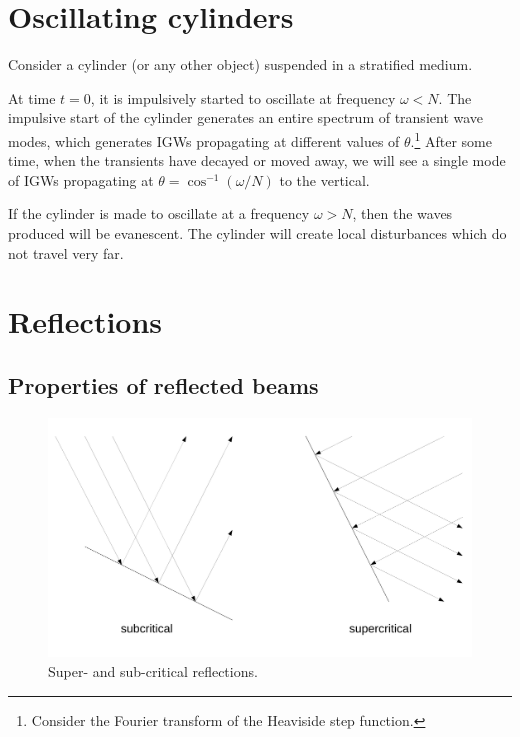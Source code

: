 \section{Oscillating cylinders}

Consider a cylinder (or any other object) suspended in a stratified medium.

At time $t=0$, it is impulsively started to oscillate at frequency $\omega<N$.
The impulsive start of the cylinder generates an entire spectrum of transient
wave modes, which generates IGWs propagating at different values of
$\theta$.\footnote{Consider the Fourier transform of the Heaviside step
function.} After some time, when the transients have decayed or moved away, we
will see a single mode of IGWs propagating at $\theta = \cos^{-1} (\omega/N)$ to
the vertical. 

If the cylinder is made to oscillate at a frequency $\omega > N$, then the waves
produced will be evanescent. The cylinder will create local disturbances which
do not travel very far.

\section{Reflections}
\subsection{Properties of reflected beams}

\begin{figure}
\begin{center}
	\includegraphics[width=14cm]{super-and-sub-critical.pdf}
	\caption{Super- and sub-critical reflections.}
	\label{fig:supersubcrit}
\end{center}
\end{figure}


